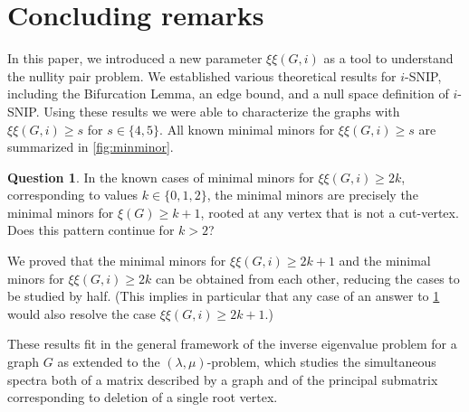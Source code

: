 \documentclass{article}
\theoremstyle{definition}
\newtheorem{question}[theorem]{Question}
\newcommand{\excise}{\xi\xi}
\begin{document}
\section{Concluding remarks}
\label{sec:conc}
In this paper, we introduced a new parameter $\excise(G,i)$ as a tool to understand the nullity pair problem.  We established various theoretical results for $i$-SNIP, including the Bifurcation Lemma, an edge bound, and a null space definition of $i$-SNIP.
Using these results we were able to characterize the graphs with $\excise(G,i) \geq s$ for $s \in \{4,5\}$.
All known minimal minors for $\excise(G, i) \geq s$ are summarized in \cref{fig:minminor}.
\begin{question}
    \label{q:xi}
    In the known cases of minimal minors for $\excise(G, i) \ge 2k$, corresponding to values $k \in \{0, 1, 2\}$, the minimal minors are precisely the minimal minors for $\xi(G) \ge k + 1$, rooted at any vertex that is not a cut-vertex.
    Does this pattern continue for $k > 2$?
\end{question}
We proved that the minimal minors for $\excise(G, i) \geq 2k + 1$ and the minimal minors for $\excise(G, i) \geq 2k$ can be obtained from each other, reducing the cases to be studied by half.
(This implies in particular that any case of an answer to \cref{q:xi} would also resolve the case $\excise(G, i) \ge 2k + 1$.)

These results fit in the general framework of the inverse eigenvalue problem for a graph $G$ as extended to the $(\lambda, \mu)$-problem, which studies the simultaneous spectra both of a matrix described by a graph and of the principal submatrix corresponding to deletion of a single root vertex.



\end{document}
